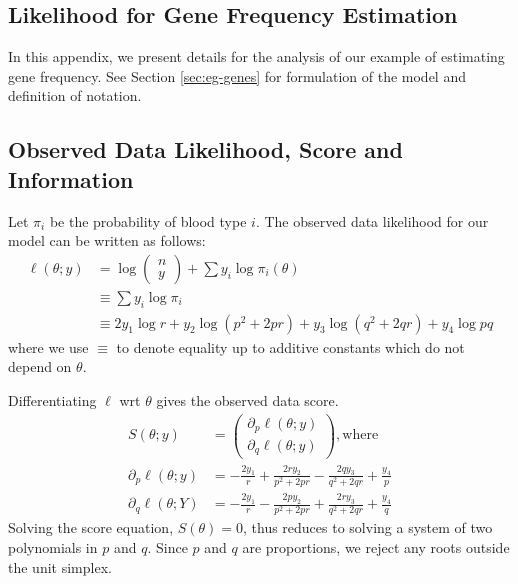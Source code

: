 \documentclass[11pt, oneside]{article}   	%
\begin{document}
\newpage

\begin{appendices}
    \section{Likelihood for Gene Frequency Estimation}
    \label{app:blood}

    In this appendix, we present details for the analysis of our example of estimating gene frequency. See Section \ref{sec:eg-genes} for formulation of the model and definition of notation.

    \subsection{Observed Data Likelihood, Score and Information}
    \label{app:blood_obs}

    Let $\pi_i$ be the probability of blood type $i$. The observed data likelihood for our model can be written as follows:
    \begin{align}
        \ell(\theta; y) &= \log \begin{pmatrix} n \\ y \end{pmatrix} + \sum y_i \log \pi_i(\theta)\\
        & \equiv \sum y_i \log \pi_i\\
        &\equiv 2 y_1 \log r + y_2 \log(p^2 + 2pr) + y_3 \log(q^2 + 2qr) + y_4 \log pq
    \end{align}
    where we use $\equiv$ to denote equality up to additive constants which do not depend on $\theta$.

    Differentiating $\ell$ wrt $\theta$ gives the observed data score.
    \begin{align}
        S(\theta; y) &= \begin{pmatrix}
            \partial_p \ell(\theta; y)\\
            \partial_q \ell(\theta; y) 
        \end{pmatrix} \mathrm{, where}\\
        \partial_p \ell(\theta; y) &= - \frac{2 y_1}{r}  + \frac{2r y_2}{p^2 + 2pr}  - \frac{2q y_3}{q^2 + 2qr}  + \frac{y_4}{p} \label{eq:gene_obs_score1}\\
        \partial_q \ell(\theta; Y) &= - \frac{2 y_1}{r}  - \frac{2p y_2}{p^2 + 2pr}  + \frac{2r y_3}{q^2 + 2qr}  + \frac{y_4}{q} \label{eq:gene_obs_score2}
    \end{align}
    Solving the score equation, $S(\theta) = 0$, thus reduces to solving a system of two polynomials in $p$ and $q$. Since $p$ and $q$ are proportions, we reject any roots outside the unit simplex.


\end{appendices}
\end{document}
